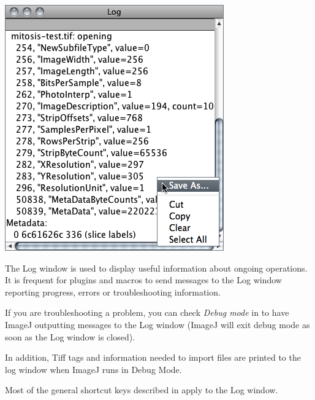 \begin{minipage}[c][1\totalheight][t]{0.495\columnwidth}%
\includegraphics[scale=0.55]{images/LogWindow1}%
\end{minipage}%
\begin{minipage}[c][1\totalheight][t]{0.505\columnwidth}%
The Log window is used to display useful information about ongoing
operations. It is frequent for plugins and macros to send messages
to the Log window reporting progress, errors or troubleshooting information.\vspace*{\medskipamount}


If you are troubleshooting a problem, you can check \emph{Debug mode}
in 
to have ImageJ outputting messages to the Log window (ImageJ will
exit debug mode as soon as the Log window is closed).\vspace*{\medskipamount}


In addition, Tiff tags and information needed to import files are
printed to the log window when ImageJ runs in Debug Mode.\vspace*{\medskipamount}


Most of the general shortcut keys described in 
apply to the Log window. %
\end{minipage}

